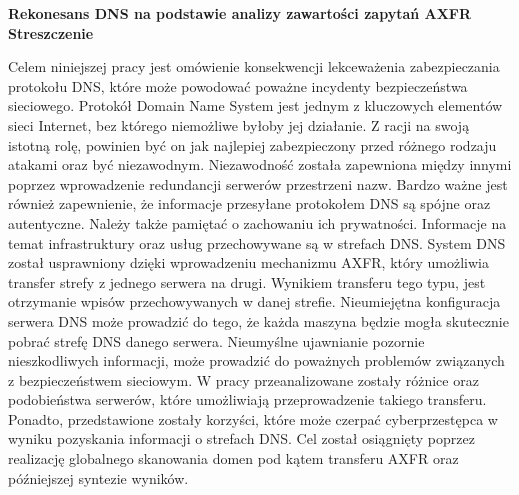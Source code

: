 \begin{center}
	\fontsize{18pt}{12pt}\selectfont\textbf{Rekonesans DNS na podstawie analizy zawartości zapytań AXFR}\\
	\vspace{1cm}
	\fontsize{15pt}{12pt}\selectfont
	\textbf{Streszczenie}
\end{center}
Celem niniejszej pracy jest omówienie konsekwencji lekceważenia zabezpieczania protokołu DNS, które może powodować poważne incydenty
bezpieczeństwa sieciowego.
Protokół Domain Name System jest jednym z kluczowych elementów sieci Internet, bez którego niemożliwe byłoby jej działanie.
Z racji na swoją istotną rolę, powinien być on jak najlepiej zabezpieczony przed różnego rodzaju atakami oraz być niezawodnym.
Niezawodność została zapewniona między innymi poprzez wprowadzenie redundancji serwerów przestrzeni nazw. Bardzo ważne jest również zapewnienie, że informacje przesyłane
protokołem DNS są spójne oraz autentyczne. Należy także pamiętać o zachowaniu ich prywatności. Informacje na temat infrastruktury
oraz usług przechowywane są w strefach DNS. System DNS został usprawniony dzięki wprowadzeniu mechanizmu AXFR, który umożliwia
transfer strefy z jednego serwera na drugi. Wynikiem transferu tego typu, jest otrzymanie wpisów przechowywanych w danej strefie.
Nieumiejętna konfiguracja serwera DNS może prowadzić do tego, że każda maszyna będzie mogła skutecznie pobrać strefę DNS danego
serwera.
Nieumyślne ujawnianie pozornie nieszkodliwych informacji, może prowadzić do poważnych problemów związanych z bezpieczeństwem sieciowym.
W pracy przeanalizowane zostały różnice oraz podobieństwa serwerów, które umożliwiają przeprowadzenie takiego transferu. Ponadto,
przedstawione zostały korzyści, które może czerpać cyberprzestępca w wyniku pozyskania informacji o strefach DNS.
Cel został osiągnięty poprzez realizację globalnego skanowania domen pod kątem transferu AXFR oraz późniejszej syntezie wyników.\\
\vspace{1cm}

